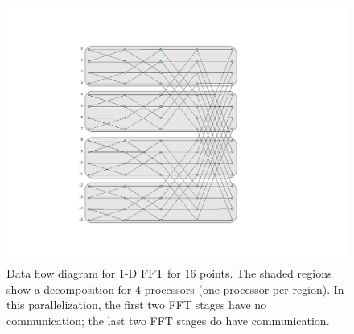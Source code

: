\begin{figure}[htbp]
\begin{center}
\includegraphics[clip=true,viewport=144 85 576 540,scale=.5]{mdchapter/fig-fft-first}
\caption{Data flow diagram for 1-D FFT for 16 points.  The shaded
regions show a decomposition for 4 processors (one processor per region).
In this parallelization, 
the first two FFT stages have no communication; the last two FFT stages
do have communication.}
\label{fig:fft1}
\end{center}
\end{figure}

